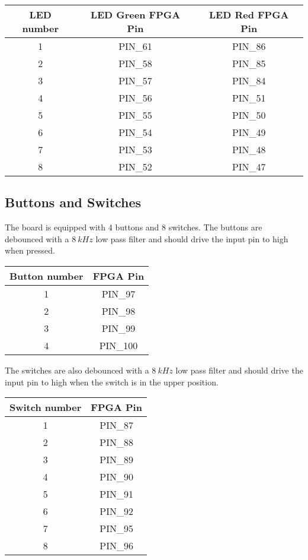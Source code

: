 \begin{center}
	\begin{tabular}{c c c}
		LED number & LED Green FPGA Pin & LED Red FPGA Pin \\
		\hline
		1 & PIN\_61 & PIN\_86 \\
		2 & PIN\_58 & PIN\_85 \\
		3 & PIN\_57 & PIN\_84 \\
		4 & PIN\_56 & PIN\_51 \\
		5 & PIN\_55 & PIN\_50 \\
		6 & PIN\_54 & PIN\_49 \\
		7 & PIN\_53 & PIN\_48 \\
		8 & PIN\_52 & PIN\_47 \\
		\hline
	\end{tabular}
\end{center}

\subsection{Buttons and Switches}
The board is equipped with 4 buttons and 8 switches.
The buttons are debounced with a $\SI{8}{kHz}$ low pass filter and should drive the input pin to high when pressed.

\begin{center}
	\begin{tabular}{c c}
		Button number & FPGA Pin \\
		\hline
		1 & PIN\_97 \\
		2 & PIN\_98 \\
		3 & PIN\_99 \\
		4 & PIN\_100 \\
		\hline
	\end{tabular}
\end{center}

The switches are also debounced with a $\SI{8}{kHz}$ low pass filter and should drive the input pin to high when the switch is in the upper position.

\begin{center}
	\begin{tabular}{c c}
		Switch number & FPGA Pin \\
		\hline
		1 & PIN\_87 \\
		2 & PIN\_88 \\
		3 & PIN\_89 \\
		4 & PIN\_90 \\
		5 & PIN\_91 \\
		6 & PIN\_92 \\
		7 & PIN\_95 \\
		8 & PIN\_96 \\
		\hline
	\end{tabular}
\end{center}


